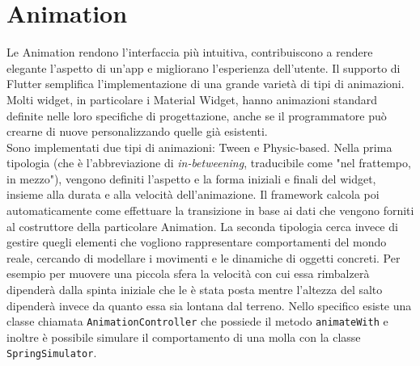 	\section{Animation}
	Le Animation rendono l'interfaccia più intuitiva, contribuiscono a
	rendere elegante 
	l'aspetto di un'app e migliorano l'esperienza dell'utente. Il
	supporto di Flutter semplifica l'implementazione di una grande varietà di tipi di
	animazioni. Molti widget, in particolare i Material Widget, hanno
	animazioni standard definite nelle loro specifiche di progettazione, 
	anche se il programmatore può crearne di nuove personalizzando quelle già esistenti. \\
	Sono implementati due tipi di animazioni: Tween e Physic-based. Nella prima tipologia
	(che è l'abbreviazione di \textit{in-betweening}, traducibile come "nel frattempo,
	in mezzo"), vengono definiti l'aspetto e la forma iniziali e finali del
	widget, insieme alla durata e alla velocità dell'animazione. Il framework
	calcola poi automaticamente come effettuare la transizione in base ai dati
	che vengono forniti al costruttore della particolare Animation. La seconda
	tipologia cerca invece di gestire quegli elementi che vogliono rappresentare
	comportamenti del mondo reale, cercando di modellare i movimenti e le
	dinamiche di oggetti concreti. Per esempio per muovere una piccola sfera la
	velocità con cui essa rimbalzerà dipenderà dalla spinta iniziale che le è
	stata posta mentre l'altezza del salto dipenderà invece da quanto essa sia lontana dal terreno.
	Nello specifico esiste una classe chiamata \texttt{AnimationController} che possiede
	il metodo \texttt{animateWith} e inoltre è possibile simulare il
	comportamento di una molla con la classe \texttt{SpringSimulator}.



	
